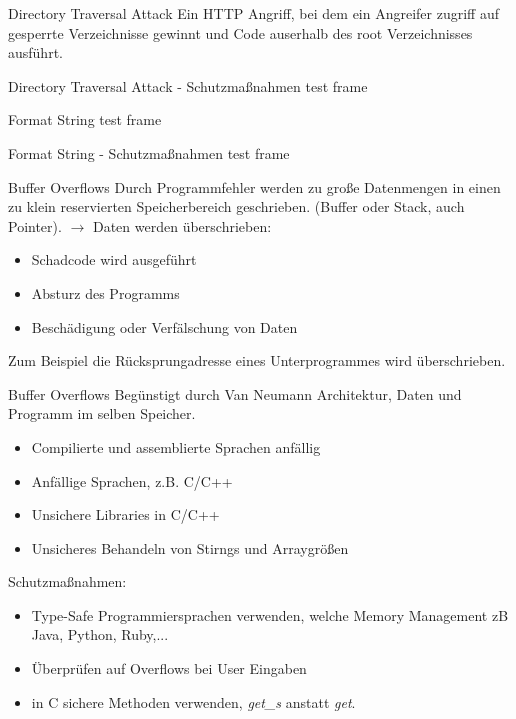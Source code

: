\documentclass[10pt]{beamer}
\begin{document}
\begin{frame}[fragile]{Directory Traversal Attack}
  Ein HTTP Angriff, bei dem ein Angreifer zugriff auf gesperrte Verzeichnisse gewinnt und Code auserhalb des root Verzeichnisses ausf\"uhrt.
\end{frame}

\begin{frame}[fragile]{Directory Traversal Attack - Schutzma{\ss}nahmen}
  test frame
\end{frame}

\begin{frame}[fragile]{Format String}
  test frame
\end{frame}

\begin{frame}[fragile]{Format String - Schutzma{\ss}nahmen}
  test frame
\end{frame}

\begin{frame}[fragile]{Buffer Overflows}
  Durch Programmfehler werden zu gro{\ss}e Datenmengen in einen zu klein reservierten Speicherbereich geschrieben.
  (Buffer oder Stack, auch Pointer).
  \newline
  \newline
  $\rightarrow$ Daten werden \"uberschrieben:
  \begin{itemize}
    \item Schadcode wird ausgef\"uhrt
    \item Absturz des Programms
    \item Besch\"adigung oder Verf\"alschung von Daten
  \end{itemize}
  Zum Beispiel die R\"ucksprungadresse eines Unterprogrammes wird \"uberschrieben.
\end{frame}

\begin{frame}[fragile]{Buffer Overflows}
  Beg\"unstigt durch Van Neumann Architektur, Daten und Programm im selben Speicher.
  \begin{itemize}
    \item Compilierte und assemblierte Sprachen anf\"allig
    \item Anf\"allige Sprachen, z.B. C/C++
    \item Unsichere Libraries in C/C++
    \item Unsicheres Behandeln von Stirngs und Arraygr\"o{\ss}en
  \end{itemize}
  Schutzma{\ss}nahmen:
  \begin{itemize}
    \item Type-Safe Programmiersprachen verwenden, welche Memory Management zB Java, Python, Ruby,...
    \item \"Uberpr\"ufen auf Overflows bei User Eingaben
    \item in C sichere Methoden verwenden, \textit{get\_s} anstatt \textit{get}.
  \end{itemize}
\end{frame}
\end{document}
